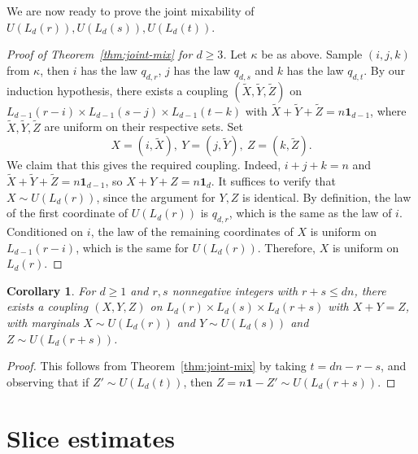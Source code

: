 \documentclass{article}
\newcommand{\ones}{\mathbf{1}}
\newtheorem{cor}[thm]{Corollary}
\theoremstyle{definition}
\begin{document}
We are now ready to prove the joint mixability of $U(L_d(r)),U(L_d(s)),U(L_d(t))$. 

\begin{proof}[Proof of Theorem~\ref{thm:joint-mix} for $d\geq 3$]
    Let $\kappa$ be as above. Sample $(i,j,k)$ from $\kappa$, then $i$ has the law $q_{d,r}$, $j$ has the law $q_{d,s}$ and $k$ has the law $q_{d,t}$. By our induction hypothesis, there exists a coupling $(\tilde{X},\tilde{Y},\tilde{Z})$ on $L_{d-1}(r-i)\times L_{d-1}(s-j)\times L_{d-1}(t-k)$ with $\tilde{X}+\tilde{Y}+\tilde{Z}=n\ones_{d-1}$, where $\tilde{X},\tilde{Y},\tilde{Z}$ are uniform on their respective sets. Set 
    \[X=(i,\tilde{X}),\ Y=(j,\tilde{Y}),\ Z=(k,\tilde{Z}).\]
    We claim that this gives the required coupling. Indeed, $i+j+k=n$ and $\tilde{X}+\tilde{Y}+\tilde{Z}=n\ones_{d-1}$, so $X+Y+Z=n\ones_d$. It suffices to verify that $X\sim U(L_d(r))$, since the argument for $Y,Z$ is identical. By definition, the law of the first coordinate of $U(L_d(r))$ is $q_{d,r}$, which is the same as the law of $i$. Conditioned on $i$, the law of the remaining coordinates of $X$ is uniform on $L_{d-1}(r-i)$, which is the same for $U(L_d(r))$. Therefore, $X$ is uniform on $L_d(r)$.
\end{proof}

\begin{cor} \label{cor:joint-mix-sum}
    For $d\geq 1$ and $r,s$ nonnegative integers with $r+s\leq dn$, there exists a coupling $(X,Y,Z)$ on $L_{d}(r)\times L_{d}(s)\times L_{d}(r+s)$ with $X+Y=Z$, with marginals $X\sim U(L_{d}(r))$ and $Y\sim U(L_{d}(s))$ and $Z\sim U(L_{d}(r+s))$.
\end{cor}
\begin{proof}
    This follows from Theorem~\ref{thm:joint-mix} by taking $t=dn-r-s$, and observing that if $Z'\sim U(L_{d}(t))$, then $Z=n\ones-Z'\sim U(L_{d}(r+s))$.
\end{proof}


\section{Slice estimates}
\end{document}
